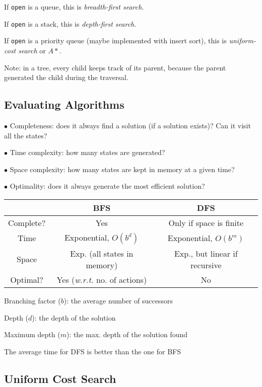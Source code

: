 \documentclass[english,openany]{book}
\begin{document}
    If \texttt{open} is a queue, this is \textit{breadth-first search}.
    
    If \texttt{open} is a stack, this is \textit{depth-first search}.
    
    If \texttt{open} is a priority queue (maybe implemented with insert sort), this is \textit{uniform-cost search} or $A*$.
    
    Note: in a tree, every child keeps track of its parent, because the parent generated the child during the traversal.
    
    \subsection{Evaluating Algorithms}
    
    $\bullet$ Completeness: does it always find a solution (if a solution exists)? Can it visit all the states?
    
    $\bullet$ Time complexity: how many states are generated?
    
    $\bullet$ Space complexity: how many states are kept in memory at a given time?
    
    $\bullet$ Optimality: does it always generate the most efficient solution?\\
    
    \begin{tabular}{|c|c|c|}
        \hline
        & BFS & DFS  \\
        \hline
        Complete? & Yes & Only if space is finite \\
        Time & Exponential, $O(b^d)$& Exponential, $O(b^m)$\\
        Space & Exp. (all states in memory) & Exp., but linear if recursive\\
        Optimal? & Yes (\textit{w.r.t.} no. of actions) & No\\
        \hline
    \end{tabular}
    
    Branching factor ($b$): the average number of successors
    
    Depth ($d$): the depth of the solution
    
    Maximum depth ($m$): the max. depth of the solution found
    
    The average time for DFS is better than the one for BFS
    
    \subsection{Uniform Cost Search}
    
\end{document}
